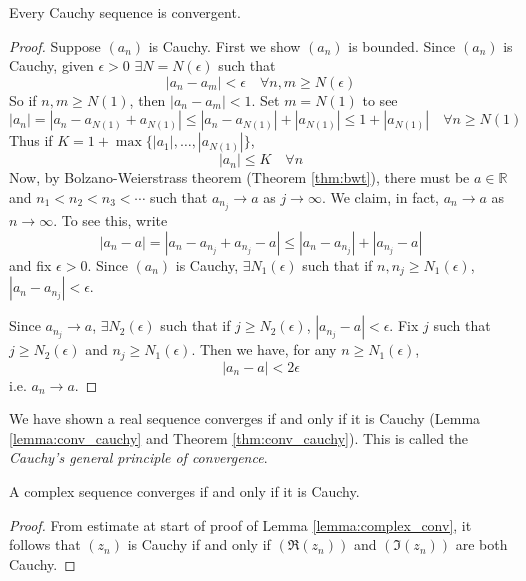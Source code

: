 \documentclass[10pt, a4paper, twoside]{report}
\begin{document}
\begin{theorem}
    Every Cauchy sequence is convergent.
    \label{thm:conv_cauchy}
\end{theorem}
\begin{proof}
    Suppose \((a_n)\) is Cauchy. First we show \((a_n)\) is bounded. Since \((a_n)\) is Cauchy, given \(\epsilon>0\) \(\exists N=N(\epsilon)\) such that 
    \[|a_n-a_m|<\epsilon\quad\forall n,m\geq N(\epsilon)\]
    So if \(n,m\geq N(1)\), then \(|a_n-a_m|<1\). Set \(m=N(1)\) to see 
    \[|a_n|=|a_n-a_{N(1)}+a_{N(1)}|\leq|a_n-a_{N(1)}|+|a_{N(1)}|\leq 1+|a_{N(1)}|\quad\forall n\geq N(1)\]
    Thus if \(K=1+\max\{|a_1|,\ldots,|a_{N(1)}|\}\),
    \[|a_n|\leq K\quad\forall n\]
    Now, by Bolzano-Weierstrass theorem (Theorem \ref{thm:bwt}), there must be \(a\in\mathbb{R}\) and \(n_1<n_2<n_3<\cdots\) such that \(a_{n_j}\to a\) as \(j\to\infty\). We claim, in fact, \(a_n\to a\) as \(n\to\infty\). To see this, write
    \[|a_n-a|=|a_n-a_{n_j}+a_{n_j}-a|\leq|a_n-a_{n_j}|+|a_{n_j}-a|\] and fix \(\epsilon>0\). Since \((a_n)\) is Cauchy, \(\exists N_1(\epsilon)\) such that if \(n,n_j\geq N_1(\epsilon)\), \(|a_n-a_{n_j}|<\epsilon\). 

    Since \(a_{n_j}\to a\), \(\exists N_2(\epsilon)\) such that if \(j\geq N_2(\epsilon)\), \(|a_{n_j}-a|<\epsilon\). Fix \(j\) such that \(j\geq N_2(\epsilon)\) and \(n_j\geq N_1(\epsilon)\). Then we have, for any \(n\geq N_1(\epsilon)\),
    \[|a_n-a|<2\epsilon\]
    i.e. \(a_n\to a\).
\end{proof}
We have shown a real sequence converges if and only if it is Cauchy (Lemma \ref{lemma:conv_cauchy} and Theorem \ref{thm:conv_cauchy}). This is called the \emph{Cauchy's general principle of convergence}.
\begin{corollary}
    A complex sequence converges if and only if it is Cauchy.
\end{corollary}
\begin{proof}
    From estimate at start of proof of Lemma \ref{lemma:complex_conv}, it follows that \((z_n)\) is Cauchy if and only if \((\Re(z_n))\) and \((\Im(z_n))\) are both Cauchy.
\end{proof}
\end{document}
